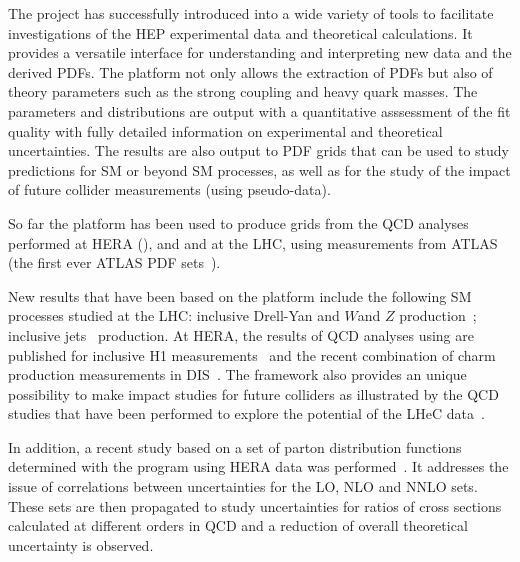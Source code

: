 The \fitter project has successfully introduced into a wide variety
of tools to facilitate investigations of the HEP experimental data
and theoretical calculations. It provides a versatile interface
for understanding and interpreting new data and the derived PDFs.
The \fitter platform not only allows the extraction of PDFs but also of theory 
parameters such as the strong coupling and heavy quark masses. The parameters and distributions are output with a
quantitative asssessment of the fit quality with fully detailed information on 
experimental and theoretical uncertainties.
The results are also output to PDF \lhapdf grids that can be used to study predictions for SM or beyond SM processes, as well as for the study of the impact of 
future collider measurements (using pseudo-data).


So far the \fitter platform has been used to produce grids 
from the QCD analyses performed at 
HERA (\cite{h1zeus:2009wt}), and and at the LHC, using 
measurements from ATLAS~\cite{atlas:strange,atlas:jets} (the first ever ATLAS PDF sets~\cite{atlas:grids}).

New results that have been based on the \fitter platform include 
the following SM processes 
studied at the LHC:  inclusive Drell-Yan and $W$and $Z$ 
production~\cite{atlas:strange,atlas:hm,cms:strange};
inclusive jets~\cite{atlas:jets,cms:jets} production.
At HERA, the results of QCD analyses using \fitter are 
published for inclusive H1 measurements~\cite{h1:2012kk}
and the recent combination of charm production measurements 
in DIS~\cite{h1zeus:charm}.
The \fitter framework also provides an unique possibility to 
make impact studies for future colliders
as illustrated by the QCD studies that have been performed to 
explore the potential of the LHeC data~\cite{lhec:studies}.

In addition, a recent study based on a set of parton distribution functions 
determined with the \fitter program using HERA data was performed~\cite{hfcorrpaper}.
It addresses the issue of correlations between uncertainties for the LO,
NLO and NNLO sets. These sets are then propagated to study uncertainties 
for ratios of cross sections calculated at different orders in QCD and  
a reduction of overall theoretical uncertainty is observed.

